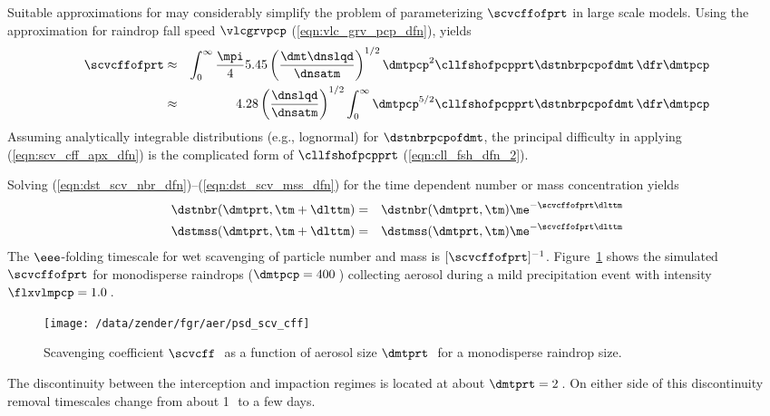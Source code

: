\documentclass[12pt,twoside]{book}
\begin{document}
Suitable approximations for  may considerably simplify
the problem of parameterizing $\scvcffofprt$ in large scale models.
Using the approximation for raindrop fall speed $\vlcgrvpcp$
(\ref{eqn:vlc_grv_pcp_dfn}), yields
\begin{eqnarray}
\scvcffofprt 
& \approx &
\int_{0}^{\infty} \frac{\mpi}{4} 
5.45 \left( \frac{\dmt \dnslqd}{\dnsatm } \right)^{1/2}
\dmtpcp^{2} \cllfshofpcpprt \dstnbrpcpofdmt \,\dfr\dmtpcp \nonumber \\
& \approx &
4.28 \left( \frac{\dnslqd}{\dnsatm } \right)^{1/2}
\int_{0}^{\infty} \dmtpcp^{5/2} \cllfshofpcpprt \dstnbrpcpofdmt \,\dfr\dmtpcp
\label{eqn:scv_cff_apx_dfn}
\end{eqnarray}
Assuming analytically integrable distributions (e.g., lognormal) for 
$\dstnbrpcpofdmt$, the principal difficulty in applying
(\ref{eqn:scv_cff_apx_dfn}) is the complicated form of
$\cllfshofpcpprt$ (\ref{eqn:cll_fsh_dfn_2}).

Solving (\ref{eqn:dst_scv_nbr_dfn})--(\ref{eqn:dst_scv_mss_dfn})
for the time dependent number or mass concentration yields
\begin{eqnarray}
\label{eqn:nbr_tm_sln}
\dstnbr( \dmtprt , \tm + \dlttm ) & = & 
\dstnbr( \dmtprt , \tm ) \me^{- \scvcffofprt \dlttm} \\
\label{eqn:mss_tm_sln}
\dstmss( \dmtprt , \tm + \dlttm ) & = & 
\dstmss( \dmtprt , \tm ) \me^{- \scvcffofprt \dlttm}
\end{eqnarray}
The $\eee$-folding timescale for wet scavenging of particle number and
mass is $[\scvcffofprt]^{-1}$.
Figure~\ref{fgr:scv_cff} shows the simulated $\scvcffofprt$ for
monodisperse raindrops ($\dmtpcp = 400$\,\um) collecting aerosol
during a mild precipitation event with intensity 
$\flxvlmpcp = 1.0$\,\mmxhr.
\begin{figure*}
\begin{center}
\texttt{[image: /data/zender/fgr/aer/psd\_scv\_cff]}\vfill
\end{center}
\caption[Scavenging coefficient]{
Scavenging coefficient $\scvcff$\,\xs\ as a function of aerosol size  
$\dmtprt$\,\um\ for a monodisperse raindrop size.
\label{fgr:scv_cff}}
\end{figure*}
The discontinuity between the interception and impaction regimes is 
located at about $\dmtprt = 2$\,\um.
On either side of this discontinuity removal timescales change from
about 1\,\hr\ to a few days.
\end{document}
